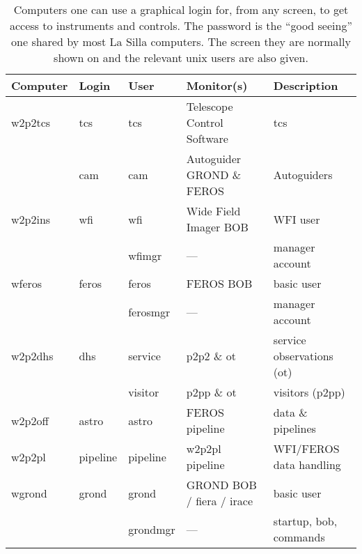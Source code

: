 \documentclass[11pt,fleqn,a4paper]{book}
\begin{document}
\begin{table}
    \caption[Main workstations and users]{Computers one can use a graphical login for, from any screen, to get access to instruments and controls.  The password is the ``good seeing'' one shared by most  La Silla computers. The screen they are normally shown on and the relevant unix users are also given.  }
\label{fig:computers}
\centering
\begin{tabular}{lllll}
\hline
Computer         & Login    & User     & Monitor(s)                 & Description\\\hline\hline
\gls{w2p2tcs} & tcs      & tcs      & Telescope Control Software & \gls{tcs}\\
              & cam      & cam      & Autoguider GROND \& FEROS  & Autoguiders\\
\gls{w2p2ins} & wfi      & wfi      & Wide Field Imager BOB      & WFI user\\
              &          & wfimgr   & ---                        & manager account\\
\gls{wferos}  & feros    & feros    & FEROS BOB                  & basic user\\
              &          & ferosmgr & ---                        & manager account\\
\gls{w2p2dhs} & dhs      & service  & p2p2 \& ot                 & \gls{service} observations (ot)\\
              &          & visitor  & p2pp \& ot                 & \glspl{visitor} (p2pp)\\
\gls{w2p2off} & astro    & astro    & FEROS pipeline             & data \& pipelines\\
\gls{w2p2pl}  & pipeline & pipeline & w2p2pl pipeline            & WFI/FEROS data handling\\       
\gls{wgrond}  & grond    & grond    & GROND BOB / \gls{fiera} / \gls{irace}  & basic user\\
              &          & grondmgr & ---                        & startup, \gls{bob}, commands\\
\hline
\end{tabular}
\end{table}
\end{document}
